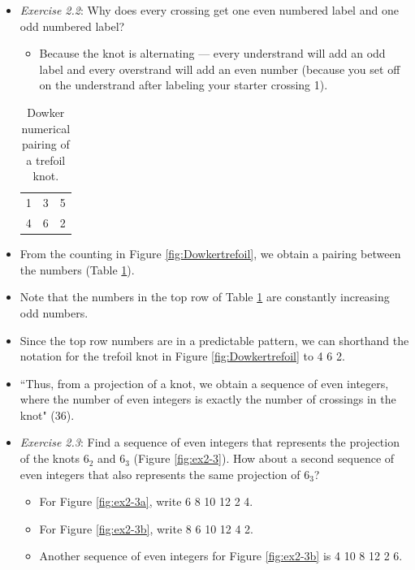 \documentclass[titlepage]{article}
\numberwithin{figure}{section}
\numberwithin{table}{section}
\numberwithin{equation}{section}
\newcommand{\dq}[2]{``#1" (#2).}
\begin{document}
\begin{itemize}
    \item \emph{Exercise 2.2}: Why does every crossing get one even numbered label and one odd numbered label?
    \begin{itemize}
        \item Because the knot is alternating --- every understrand will add an odd label and every overstrand will add an even number (because you set off on the understrand after labeling your starter crossing 1).
    \end{itemize}
    \begin{table}[h!]
        \centering
        \begin{tabular}{ccc}
            1 & 3 & 5\\
            4 & 6 & 2
        \end{tabular}
        \caption{Dowker numerical pairing of a trefoil knot.}
        \label{tab:Dowkertrefoil}
    \end{table}
    \item From the counting in Figure \ref{fig:Dowkertrefoil}, we obtain a pairing between the numbers (Table \ref{tab:Dowkertrefoil}).
    \item Note that the numbers in the top row of Table \ref{tab:Dowkertrefoil} are constantly increasing odd numbers.
    \item Since the top row numbers are in a predictable pattern, we can shorthand the notation for the trefoil knot in Figure \ref{fig:Dowkertrefoil} to 4 6 2.
    \item \dq{Thus, from a projection of a knot, we obtain a sequence of even integers, where the number of even integers is exactly the number of crossings in the knot}{36}
    \item \emph{Exercise 2.3}: Find a sequence of even integers that represents the projection of the knots $6_2$ and $6_3$ (Figure \ref{fig:ex2-3}). How about a second sequence of even integers that also represents the same projection of $6_3$?
    \begin{itemize}
        \item For Figure \ref{fig:ex2-3a}, write 6 8 10 12 2 4.
        \item For Figure \ref{fig:ex2-3b}, write 8 6 10 12 4 2.
        \item Another sequence of even integers for Figure \ref{fig:ex2-3b} is 4 10 8 12 2 6.
    \end{itemize}
    \begin{figure}[h!]
        \centering
        \begin{subfigure}[b]{0.2\linewidth}

\end{subfigure}
\end{figure}
\end{itemize}
\end{document}

